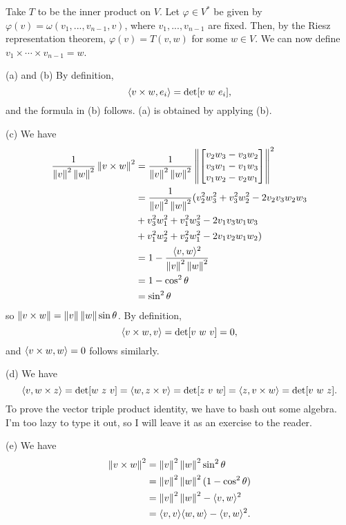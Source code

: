 \documentclass[11pt]{scrartcl}
\begin{document}
\begin{problem*}[4-8]
\end{problem*}
Take $T$ to be the inner product on $V$.
Let $\varphi\in V^*$ be given by $\varphi(v) = \omega(v_1, ..., v_{n - 1}, v)$, 
where $v_1, ..., v_{n - 1}$ are fixed.
Then, by the Riesz representation theorem, $\varphi(v) = T(v, w)$ for some $w\in V$.
We can now define $v_1\times \cdots \times v_{n - 1} = w$.

\begin{problem*}[4-9]
\end{problem*}
(a) and (b) By definition, 
$$
    \langle v\times w, e_i \rangle = \det[v \ w\ e_i],
$$
and the formula in (b) follows.
(a) is obtained by applying (b).

(c) We have 
\begin{align*}
    \frac{1}{\left\lVert v \right\rVert^2\left\lVert w \right\rVert^2}\left\lVert v\times w \right\rVert^2
    &=
    \frac{1}{\left\lVert v \right\rVert^2\left\lVert w \right\rVert^2}
    \left\lVert \begin{bmatrix} 
        v_2w_3 - v_3w_2 \\
        v_3w_1 - v_1w_3 \\
        v_1w_2 - v_2w_1
     \end{bmatrix} \right\rVert^2 \\
    &=
    \frac{1}{\left\lVert v \right\rVert^2\left\lVert w \right\rVert^2}
    (
        v_2^2w_3^2 + v_3^2w_2^2 - 2v_2v_3w_2w_3 \\
        &+
        v_3^2w_1^2 + v_1^2w_3^2 - 2v_1v_3w_1w_3 \\
        &+
        v_1^2w_2^2 + v_2^2w_1^2 - 2v_1v_2w_1w_2
    ) \\
    &= 1 - \frac{\langle v, w \rangle^2}{\left\lVert v \right\rVert^2\left\lVert w \right\rVert^2} \\
    &= 1 - \cos^2\theta \\
    &= \sin^2\theta
\end{align*}
so $\left\lVert v\times w \right\rVert = \left\lVert v \right\rVert\left\lVert w \right\rVert\sin\theta$.
By definition, 
$$
    \langle v\times w, v \rangle = \det[v\ w\ v] = 0,
$$
and $\langle v\times w, w \rangle = 0$ follows similarly.

(d) We have
$$
    \lra{v, w\times z} = \det[w\ z\ v] = \lra{w, z\times v} = \det[z\ v\ w] = \lra{z, v\times w} = \det[v\ w\ z].
$$
To prove the vector triple product identity, we have to bash out some algebra.
I'm too lazy to type it out, so I will leave it as an exercise to the reader.

(e) We have 
\begin{align*}
    \left\lVert v\times w \right\rVert^2 
    &=
    \left\lVert v \right\rVert^2\left\lVert w \right\rVert^2\sin^2\theta \\
    &=
    \left\lVert v \right\rVert^2\left\lVert w \right\rVert^2(1 - \cos^2\theta) \\
    &=
    \left\lVert v \right\rVert^2\left\lVert w \right\rVert^2 - \langle v, w \rangle^2 \\
    &=
    \langle v, v \rangle\langle w, w \rangle - \langle v, w \rangle^2.
\end{align*}
\end{document}
